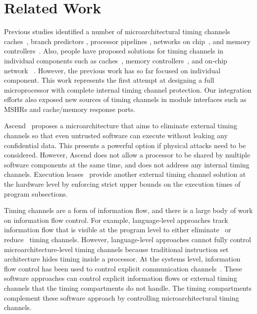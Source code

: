 \section{Related Work}

Previous studies identified 
a number of microarchitectural timing channels 
caches~\cite{percival,bernstein,caseofaes,remoteaes,analyticalcache,collision,
deconstructing,cachegames}, branch predictors 
\cite{branchpred,predictingbranch}, processor
pipelines \cite{pipelines}, networks on chip~\cite{yaonocs,surfnoc}, and memory
controllers~\cite{ushpca14,fletcher-hpca14}. 
Also, people have proposed solutions for timing channels in
individual components such as caches~\cite{newcache,deconstructing}, memory
controllers~\cite{ushpca14,fletcher-hpca14}, and on-chip network
~\cite{yaonocs,surfnoc}.
However, the previous work has
so far focused on individual component. This work represents the first attempt
at designing a full microprocessor with complete internal timing channel protection.
Our integration efforts also exposed new sources of timing channels in module
interfaces such as MSHRs and cache/memory response ports.


Ascend~\cite{ascend} proposes a
microarchitecture that aims to eliminate external timing channels so that
even untrusted software can execute without leaking any confidential
data. This presents a powerful option if physical attacks need to be
considered. However, Ascend does not allow a processor to be shared by
multiple software components at the same time, and does not address 
any internal timing channels.
Execution leases~\cite{execution_leases} 
provide another external timing channel solution at the hardware level by 
enforcing strict upper bounds on the execution times of program subsections. 

Timing channels are a form of information flow, and there is a large body
of work on information flow control. For example, language-level approaches
track information flow that is visible at the program level to either 
eliminate~\cite{quantleaks} or 
reduce~\cite{mitigation1,mitigation2,mitigation3} timing channels. 
However, language-level approaches cannot fully control microarchitecture-level
timing channels because traditional instruction set architecture hides
timing inside a processor.
At the 
systems level, information flow control has been used to control
explicit communication channels~\cite{flume-sosp07,histar-sosp06,laminar-pldi09}. 
These software approaches can control explicit information flows or external
timing channels that the timing compartments do not handle.
The timing compartments complement these software approach by
controlling microarchitectural timing channels.

